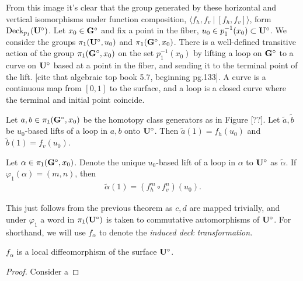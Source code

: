 \documentclass[a4paper, 11pt]{article}
\def\<{\langle} \def\>{\rangle}
\begin{document}
\begin{figure}[H]
\centering

\end{figure}

From this image it's clear that the group generated by these horizontal and vertical isomorphisms under function composition, $\<f_h,f_v~\vert~[f_h,f_v] \>$, form $\text{Deck}_{p_1}(\mathbf{U}^\circ)$. Let $x_0\in\mathbf{G}^\circ$ and fix a point in the fiber, $u_0\in p_{1}^{-1}(x_0)\subset\mathbf{U}^\circ$. We consider the groups $\pi_1(\mathbf{U}^\circ,u_0)$ and $\pi_1(\mathbf{G}^\circ,x_0)$. There is a well-defined transitive action of the group $\pi_1(\mathbf{G}^\circ,x_0)$ on the set $p_{1}^{-1}(x_0)$ by lifting a loop on $\mathbf{G}^\circ$ to a curve on $\mathbf{U}^\circ$ based at a point in the fiber, and sending it to the terminal point of the lift. [cite that algebraic top book 5.7, beginning pg.133]. A curve is a continuous map from $[0,1]$ to the surface, and a loop is a closed curve where the terminal and initial point coincide.

\begin{thm}
Let $a,b\in\pi_1(\mathbf{G}^\circ,x_0)$ be the homotopy class generators as in Figure [??]. Let $\tilde{a},\tilde{b}$ be $u_0$-based lifts of a loop in $a,b$ onto $\mathbf{U}^\circ$. Then $\tilde{a}(1)=f_h(u_0)$ and $\tilde{b}(1)=f_v(u_0)$.
\end{thm}

\begin{cor}
Let $\alpha\in\pi_1(\mathbf{G}^\circ,x_0)$. Denote the unique $u_0$-based lift of a loop in $\alpha$ to $\mathbf{U}^\circ$ as $\tilde{\alpha}$. If $\varphi_1(\alpha)=(m,n)$, then 
\begin{align}
\tilde{\alpha}(1)=(f_h^m\circ f_v^n)(u_0).
\end{align}
\end{cor}
This just follows from the previous theorem as $c,d$ are mapped trivially, and under $\varphi_1$ a word in $\pi_1(\mathbf{U}^\circ)$ is taken to commutative automorphisms of $\mathbf{U}^\circ$. For shorthand, we will use $f_\alpha$ to denote the \emph{induced deck transformation.} 

\begin{lem}
$f_\alpha$ is a local diffeomorphism of the surface $\mathbf{U}^\circ$. 
\begin{proof}
Consider a 
\end{proof}
\end{lem}
\end{document}
